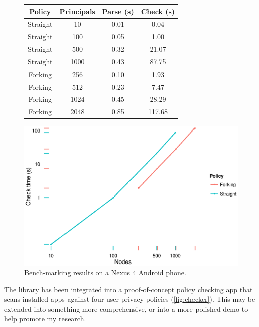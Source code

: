 \documentclass[a4paper]{scrartcl}
\begin{document}
\begin{figure}
  \begin{minipage}{0.49\linewidth}
    \footnotesize
    \begin{tabular}{cccc}
       \toprule
       Policy   & Principals & Parse (s) & Check (s) \\
       \midrule
       Straight & 10    & 0.01      & 0.04      \\
       Straight & 100   & 0.05      & 1.00      \\
       Straight & 500   & 0.32      & 21.07     \\
       Straight & 1000  & 0.43      & 87.75     \\
       \midrule
       Forking  & 256   & 0.10      & 1.93      \\
       Forking  & 512   & 0.23      & 7.47      \\
       Forking  & 1024  & 0.45      & 28.29     \\
       Forking  & 2048  & 0.85      & 117.68    \\
       \bottomrule
    \end{tabular}
  \end{minipage}
  \begin{minipage}{0.49\linewidth}
    \includegraphics[width=\linewidth]{./images/benchmarks.eps}
  \end{minipage}
  \caption{Bench-marking results on a Nexus 4 Android phone.}
  \label{fig:benchmarks}
\end{figure}

The library has been integrated into a proof-of-concept policy checking app that scans installed apps against four user privacy policies (\autoref{fig:checker}).
This may be extended into something more comprehensive, or into a more polished demo to help promote my research.
\end{document}
